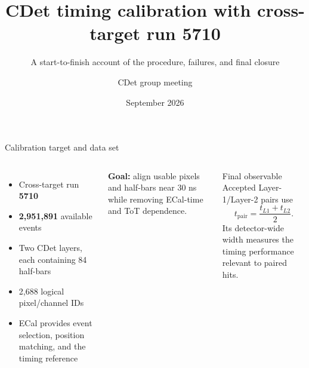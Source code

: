\documentclass[aspectratio=169,10pt]{beamer}
\title{CDet timing calibration with cross-target run 5710}
\subtitle{A start-to-finish account of the procedure, failures, and final closure}
\author{CDet group meeting}
\date{September 2026}
\newcommand{\lesson}[1]{\textcolor{CDetOrange}{\textbf{#1}}}
\begin{document}
\begin{frame}[plain]
  \vspace{1.4cm}
  {\color{white}\LARGE\bfseries\inserttitle\par}
  \vspace{0.45cm}
  {\color{CDetLightBlue}\large\insertsubtitle\par}
  \vfill
  {\color{white}\insertauthor\par}
  {\color{CDetLightBlue}\insertdate\par}
  \vspace{0.5cm}
\end{frame}

\begin{frame}{Calibration target and data set}
\begin{columns}[T,onlytextwidth]
  \begin{itemize}
    \item Cross-target run \textbf{5710}
    \item \textbf{2,951,891} available events
    \item Two CDet layers, each containing 84 half-bars
    \item 2,688 logical pixel/channel IDs
    \item ECal provides event selection, position matching, and the timing reference
  \end{itemize}
  \vspace{0.25cm}
  \lesson{Goal:} align usable pixels and half-bars near 30 ns while removing ECal-time and ToT dependence.

  \begin{block}{Final observable}
    Accepted Layer-1/Layer-2 pairs use
    \[
      t_{\mathrm{pair}}=\frac{t_{L1}+t_{L2}}{2}.
    \]
    Its detector-wide width measures the timing performance relevant to paired hits.
  \end{block}
\end{columns}
\end{frame}
\end{document}
